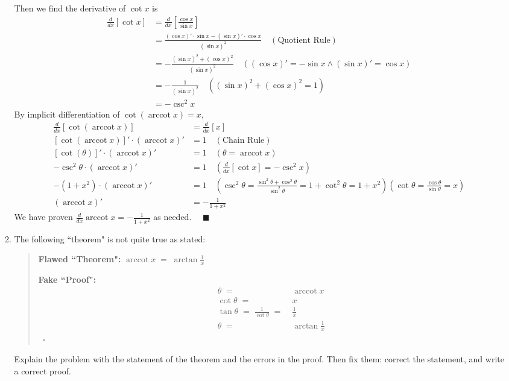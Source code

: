 \documentclass[12pt]{exam}
\newcommand {\DS} [1] {${\displaystyle #1}$}
\DeclareMathOperator{\arccot}{arccot}
\begin{document}
\begin{enumerate}
\begin{enumerate}
		Then we find the derivative of $\cot x$ is
		\begin{align*}
		    \frac{d}{dx}[\cot x]&=\frac{d}{dx}[\frac{\cos x}{\sin x}]\\
		    &=\frac{(\cos x)'\cdot\sin x-(\sin x)'\cdot\cos x}{(\sin x)^2}\quad(\mbox{Quotient Rule})\\
		    &=-\frac{(\sin x)^2+(\cos x)^2}{(\sin x)^2}\quad((\cos x)'=-\sin x \land (\sin x)'=\cos x)\\
		    &=-\frac{1}{(\sin x)^2}\quad((\sin x)^2+(\cos x)^2=1)\\
		    &=-\csc^2 x
		\end{align*}
		By implicit differentiation of $\cot(\arccot x)=x,$
		\begin{align*}
		    \frac{d}{dx}[\cot(\arccot x)]&=\frac{d}{dx}[x]\\
		    [\cot(\arccot x)]'\cdot (\arccot x)'&=1\quad(\mbox{Chain Rule})\\
		    [\cot(\theta)]'\cdot (\arccot x)'&=1\quad(\theta=\arccot{x})\\
		    -\csc^2\theta\cdot(\arccot x)'&=1\quad(\frac{d}{dx}[\cot x]=-\csc^2 x)\\
		    -(1+x^2)\cdot(\arccot x)'&=1\quad(\csc^2\theta=\frac{\sin^2\theta+\cos^2\theta}{\sin^2\theta}=1+\cot^2\theta=1+x^2)(\cot\theta=\frac{\cos\theta}{\sin\theta}=x)\\
		    (\arccot x)'&=-\frac{1}{1+x^2}
		\end{align*}
		We have proven $\frac{d}{dx} \arccot x=-\frac{1}{1+x^2}$ as needed. $\quad\blacksquare$
		
		\item The following ``theorem" is not quite true as stated:
		
			\begin{quotation}
			{\bf Flawed ``Theorem":}   \DS{ \arccot x \; = \; \arctan \frac{1}{x} }
			
			{\bf Fake ``Proof":}   \vspace{-.5cm}
				\begin{align*}
					\theta \; =& \; \arccot x \\
					 \cot \theta \; =& \;  x \\
					 \tan \theta \; = \; \frac{1}{\cot \theta} \; =& \; \frac{1}{x} \\
					 \theta  \; =& \;  \arctan \frac{1}{x}  
				\end{align*}
				\ \hfill $\square$
			\end{quotation}

	Explain the problem with the statement of the theorem and the errors in the proof.  Then fix them: correct the statement, and write a correct proof.
	

\end{enumerate}
\end{enumerate}
\end{document}
